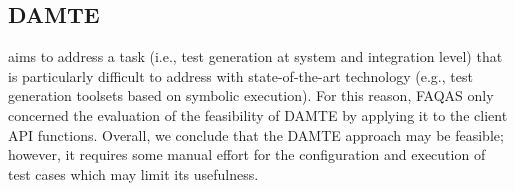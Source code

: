 
\subsection{DAMTE}

\DAMTE aims to address a task (i.e., test generation at system and integration level) that is particularly difficult to address with state-of-the-art technology (e.g., test generation toolsets based on symbolic execution). 
For this reason, FAQAS only concerned the evaluation of the feasibility of DAMTE by applying it to the \PARAM client API functions. 
Overall, we conclude that the DAMTE approach may be feasible; however, it requires some manual effort for the configuration and execution of test cases which may limit its usefulness. 


